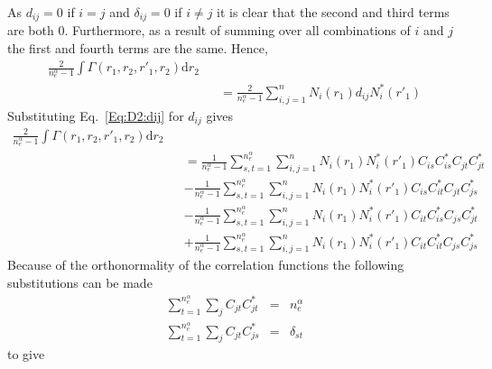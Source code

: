 \documentclass[pra,nofootinbib]{revtex4-1}
\newcommand{\nela}{{n_{e}^\alpha}}
\begin{document}
As $d_{ij} = 0$ if $i=j$ and $\delta_{ij} = 0$ if $i \ne j$ it is clear that the second and third terms are 
both $0$. Furthermore, as a result of summing over all combinations of $i$ and $j$ the first and fourth terms
are the same. Hence,
\begin{eqnarray}
  \frac{2}{\nela-1}\int\Gamma(r_1,r_2,r'_1,r_2)\mathrm{d}r_2 \nonumber \\
  &&= \frac{2}{\nela-1}\sum_{i,j=1}^{n} N_i(r_1) d_{ij} N_i^*(r'_1) 
\end{eqnarray}
Substituting Eq.~\ref{Eq:D2:dij} for $d_{ij}$ gives
\begin{eqnarray}
  \frac{2}{\nela-1}\int\Gamma(r_1,r_2,r'_1,r_2)\mathrm{d}r_2 \nonumber \\
  &&= \frac{1}{\nela-1}\sum_{s,t=1}^{\nela}\sum_{i,j=1}^{n}
      N_i(r_1) N_i^*(r'_1) C_{is}C_{is}^* C_{jt}C_{jt}^* \nonumber \\
  &&- \frac{1}{\nela-1}\sum_{s,t=1}^{\nela}\sum_{i,j=1}^{n}
      N_i(r_1) N_i^*(r'_1) C_{is}C_{it}^* C_{jt}C_{js}^* \nonumber \\
  &&- \frac{1}{\nela-1}\sum_{s,t=1}^{\nela}\sum_{i,j=1}^{n}
      N_i(r_1) N_i^*(r'_1) C_{it}C_{is}^* C_{js}C_{jt}^* \nonumber \\
  &&+ \frac{1}{\nela-1}\sum_{s,t=1}^{\nela}\sum_{i,j=1}^{n}
      N_i(r_1) N_i^*(r'_1) C_{it}C_{it}^* C_{js}C_{js}^* 
\end{eqnarray}
Because of the orthonormality of the correlation functions the following substitutions 
can be made
\begin{eqnarray}
  \sum_{t=1}^{\nela}\sum_{j}C_{jt}C^*_{jt} 
  &=& \nela \\
  \sum_{t=1}^{\nela}\sum_{j}C_{jt}C^*_{js}
  &=& \delta_{st}
\end{eqnarray}
to give
\end{document}
